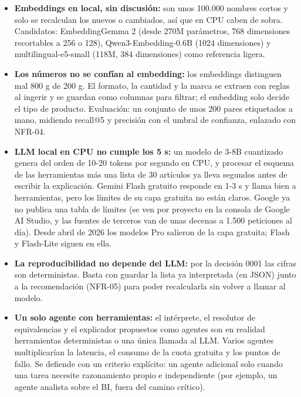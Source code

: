 \begin{tcolorbox}[colback=responsecolor, title=Insights de Claude, colframe=gray!60!black, breakable]
	\begin{itemize}
		\item \textbf{Embeddings en local, sin discusión:} son unos 100.000 nombres cortos y solo se recalculan los nuevos o cambiados, así que en CPU caben de sobra. Candidatos: EmbeddingGemma 2 (desde 270M parámetros, 768 dimensiones recortables a 256 o 128), Qwen3-Embedding-0.6B (1024 dimensiones) y multilingual-e5-small (118M, 384 dimensiones) como referencia ligera.

		\item \textbf{Los números no se confían al embedding:} los embeddings distinguen mal 800 g de 200 g. El formato, la cantidad y la marca se extraen con reglas al ingerir y se guardan como columnas para filtrar; el embedding solo decide el tipo de producto. Evaluación: un conjunto de unos 200 pares etiquetados a mano, midiendo recall@5 y precisión con el umbral de confianza, enlazado con NFR-04.

		\item \textbf{LLM local en CPU no cumple los 5 s:} un modelo de 3-8B cuantizado genera del orden de 10-20 tokens por segundo en CPU, y procesar el esquema de las herramientas más una lista de 30 artículos ya lleva segundos antes de escribir la explicación. Gemini Flash gratuito responde en 1-3 s y llama bien a herramientas, pero los límites de su capa gratuita no están claros. Google ya no publica una tabla de límites (se ven por proyecto en la consola de Google AI Studio, y las fuentes de terceros van de unas decenas a 1.500 peticiones al día). Desde abril de 2026 los modelos Pro salieron de la capa gratuita; Flash y Flash-Lite siguen en ella.

		\item \textbf{La reproducibilidad no depende del LLM:} por la decisión 0001 las cifras son deterministas. Basta con guardar la lista ya interpretada (en JSON) junto a la recomendación (NFR-05) para poder recalcularla sin volver a llamar al modelo.

		\item \textbf{Un solo agente con herramientas:} el intérprete, el resolutor de equivalencias y el explicador propuestos como agentes son en realidad herramientas deterministas o una única llamada al LLM. Varios agentes multiplicarían la latencia, el consumo de la cuota gratuita y los puntos de fallo. Se defiende con un criterio explícito: un agente adicional solo cuando una tarea necesite razonamiento propio e independiente (por ejemplo, un agente analista sobre el BI, fuera del camino crítico).


\end{itemize}
\end{tcolorbox}
